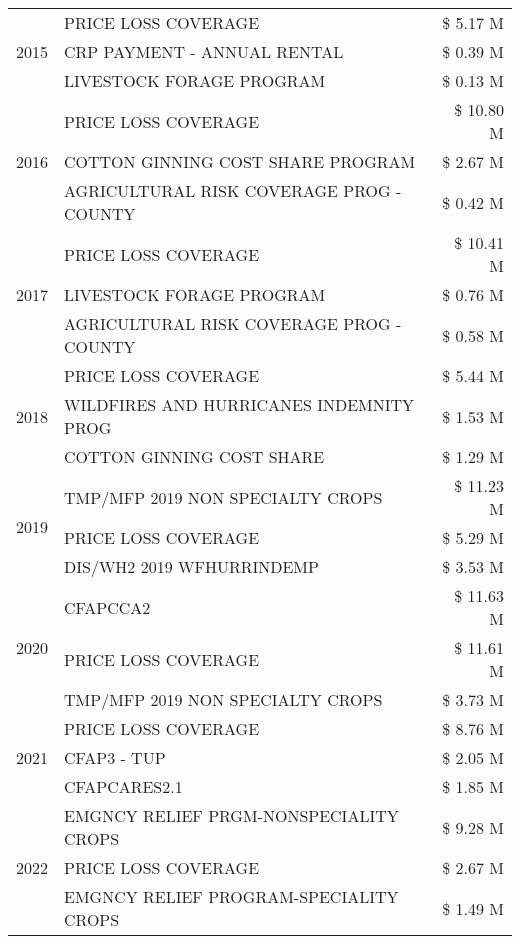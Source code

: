 \begin{tabular}{llr}
\cline{1-3}
\multirow[t]{3}{*}{2015} & PRICE LOSS COVERAGE & \$ 5.17 M \\
 & CRP PAYMENT - ANNUAL RENTAL & \$ 0.39 M \\
 & LIVESTOCK FORAGE PROGRAM & \$ 0.13 M \\
\cline{1-3}
\multirow[t]{3}{*}{2016} & PRICE LOSS COVERAGE & \$ 10.80 M \\
 & COTTON GINNING COST SHARE PROGRAM & \$ 2.67 M \\
 & AGRICULTURAL RISK COVERAGE PROG - COUNTY & \$ 0.42 M \\
\cline{1-3}
\multirow[t]{3}{*}{2017} & PRICE LOSS COVERAGE & \$ 10.41 M \\
 & LIVESTOCK FORAGE PROGRAM & \$ 0.76 M \\
 & AGRICULTURAL RISK COVERAGE PROG - COUNTY & \$ 0.58 M \\
\cline{1-3}
\multirow[t]{3}{*}{2018} & PRICE LOSS COVERAGE & \$ 5.44 M \\
 & WILDFIRES AND HURRICANES INDEMNITY PROG & \$ 1.53 M \\
 & COTTON GINNING COST SHARE & \$ 1.29 M \\
\cline{1-3}
\multirow[t]{3}{*}{2019} & TMP/MFP 2019 NON SPECIALTY CROPS & \$ 11.23 M \\
 & PRICE LOSS COVERAGE & \$ 5.29 M \\
 & DIS/WH2 2019 WFHURRINDEMP & \$ 3.53 M \\
\cline{1-3}
\multirow[t]{3}{*}{2020} & CFAPCCA2 & \$ 11.63 M \\
 & PRICE LOSS COVERAGE & \$ 11.61 M \\
 & TMP/MFP 2019 NON SPECIALTY CROPS & \$ 3.73 M \\
\cline{1-3}
\multirow[t]{3}{*}{2021} & PRICE LOSS COVERAGE & \$ 8.76 M \\
 & CFAP3 - TUP & \$ 2.05 M \\
 & CFAPCARES2.1 & \$ 1.85 M \\
\cline{1-3}
\multirow[t]{3}{*}{2022} & EMGNCY RELIEF PRGM-NONSPECIALITY CROPS & \$ 9.28 M \\
 & PRICE LOSS COVERAGE & \$ 2.67 M \\
 & EMGNCY RELIEF PROGRAM-SPECIALITY CROPS & \$ 1.49 M \\
\cline{1-3}
\bottomrule
\end{tabular}
